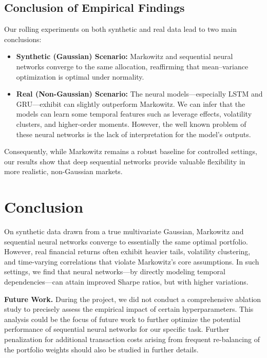 \documentclass[11pt]{article}
\begin{document}
\subsection{Conclusion of Empirical Findings}
Our rolling experiments on both synthetic and real data lead to two main conclusions:
\begin{itemize}
    \item \textbf{Synthetic (Gaussian) Scenario:} Markowitz and sequential neural networks converge to the same allocation, reaffirming that mean--variance optimization is optimal under normality.
    \item \textbf{Real (Non-Gaussian) Scenario:} The neural models—especially LSTM and GRU—exhibit can slightly outperform Markowitz. We can infer that the models can learn some temporal features such as leverage effects, volatility clusters, and higher-order moments. However, the well known problem of these neural networks is the lack of interpretation for the model's outputs.
\end{itemize}
Consequently, while Markowitz remains a robust baseline for controlled settings, our results show that deep sequential networks provide valuable flexibility in more realistic, non-Gaussian markets.





\section{Conclusion}
On synthetic data drawn from a true multivariate Gaussian, Markowitz and sequential neural networks converge to essentially the same optimal portfolio. However, real financial returns often exhibit heavier tails, volatility clustering, and time-varying correlations that violate Markowitz's core assumptions. In such settings, we find that neural networks---by directly modeling temporal dependencies---can attain improved Sharpe ratios, but with higher variations.

\vspace{10pt}
\noindent
\textbf{Future Work.} During the project, we did not conduct a comprehensive ablation study to precisely assess the empirical impact of certain hyperparameters. This analysis could be the focus of future work to further optimize the potential performance of sequential neural networks for our specific task. Further penalization for additional transaction costs arising from frequent re-balancing of the portfolio weights should also be studied in further details.   
\end{document}
